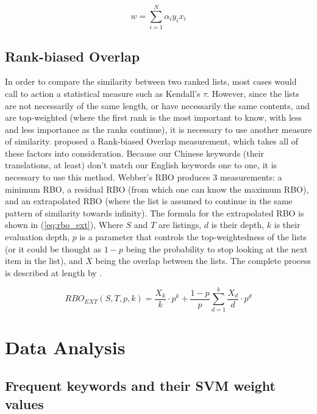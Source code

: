 \documentclass[review]{elsarticle}
\begin{document}
\begin{equation}\label{eq:svm_weight}
w = \sum_{i=1}^N \alpha_i y_i x_i
\end{equation}

\subsection{Rank-biased Overlap}\label{rbo}

In order to compare the similarity between two ranked lists, most cases would call to action a statistical measure such as Kendall's \(\tau\). However, since the lists are not necessarily of the same length, or have necessarily the same contents, and are top-weighted (where the first rank is the most important to know, with less and less importance as the ranks continue), it is necessary to use another measure of similarity. \cite{webber2010similarity} proposed a Rank-biased Overlap measurement, which takes all of these factors into consideration. Because our Chinese keywords (their translations, at least) don't match our English keywords one to one, it is necessary to use this method. Webber's RBO produces 3 measurements: a minimum RBO, a residual RBO (from which one can know the maximum RBO), and an extrapolated RBO (where the list is assumed to continue in the same pattern of similarity towards infinity). The formula for the extrapolated RBO is shown in (\ref{eq:rbo_ext}), Where \(S\) and \(T\) are listings, \(d\) is their depth, \(k\) is their evaluation depth, \(p\) is a parameter that controls the top-weightedness of the lists (or it could be thought as \(1-p\) being the probability to stop looking at the next item in the list), and \(X\) being the overlap between the lists. The complete process is described at length by \cite{webber2010similarity}.

\begin{equation}\label{eq:rbo_ext}
RBO_{EXT}(S,T,p,k) = \frac{X_k}{k} \cdot p^k + \frac{1-p}{p} \sum_{d=1}^k{\frac{X_d}{d} \cdot p^d}
\end{equation}

\section{Data Analysis}\label{dataanalysis}

\subsection{Frequent keywords and their SVM weight values}\label{svmresults}
\end{document}
